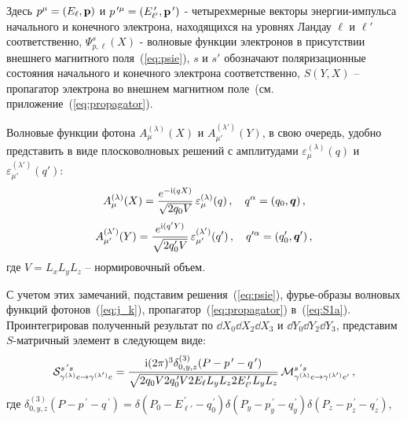 \noindent Здесь $p^{\mu} = (E_{\ell}, {\bf p})$ и $p^{\, \prime \mu} =
(E^{\, \prime}_{\ell'}, {\bf p}^{\, \prime})$ - четырехмерные векторы 
энергии-импульса начального и конечного электрона, находящихся на уровнях Ландау 
$\ell$ и $\ell'$  соответственно,
$\Psi^s_{p,\ell}(X)$ - волновые функции электронов в присутствии внешнего 
магнитного поля~(\ref{eq:psie}), $s$ и $s'$ обозначают 
поляризационные состояния начального и конечного электрона 
соответственно, $S(Y,X)$ -- пропагатор электрона во внешнем магнитном поле~(см. приложение~(\ref{eq:propagator}). 

Волновые функции фотона $A^{(\lambda)}_\mu(X)$ и $A^{(\lambda')}_{\mu'}(Y)$, в свою очередь,  удобно представить в виде плосковолновых решений с амплитудами $\varepsilon^{(\lambda)}_\mu(q)$ и $\varepsilon^{(\lambda')}_{\mu'}(q')$:
%
\begin{eqnarray}
	\label{eq:j_k}
	A^{(\lambda)}_\mu (X) = \frac{e^{-\mathrm{i}(qX)}}{\sqrt{2q_0 V}} \, \varepsilon^{(\lambda)}_\mu(q) \, , \quad  q^{\alpha} = (q_0, {\boldsymbol q})\, ,
\end{eqnarray}
%
\begin{eqnarray}
	\label{eq:j_k'}
	A^{(\lambda')}_{\mu'} (Y) = \frac{e^{\mathrm{i}(q'Y)}}{\sqrt{2q'_0 V}} \, \varepsilon^{(\lambda')}_{\mu'}(q') \, , \quad  q'^{\alpha} = (q'_0, {\boldsymbol q'})\, , 
\end{eqnarray}
\noindent где  $V = L_x L_y L_z$ -- нормировочный объем.

С учетом этих замечаний, подставим решения~(\ref{eq:psie}),  фурье-образы волновых функций фотонов~(\ref{eq:j_k}),
пропагатор~(\ref{eq:propagator})  в~(\ref{eq:S1a}).  Проинтегрировав полученный результат по $\dd X_0 \dd X_2 \dd X_3$ и  $\dd Y_0 \dd Y_2 \dd Y_3$,  представим  $S$-матричный элемент  в следующем виде:
%
\begin{eqnarray}
	\label{eq:S2}                                  
	{\cal S}^{s^{\,\prime} s}_{\gamma^{(\lambda)} e\to \gamma^{(\lambda')} e} = \frac{\mathrm{i} (2\pi)^3 
		\delta^{(3)}_{0,y,z} (P - p^{\, \prime} - q^{\, \prime})}
	{\sqrt{2q_0 V 2q^{\, \prime}_0 V 2 E_{\ell} L_y L_z 2 E^{\, \prime}_{\ell'}L_y L_z}}\, 
	{\cal M}^{s^{\, \prime} s}_{\gamma^{(\lambda)} e\to \gamma^{(\lambda')} e'} \, , 
\end{eqnarray}
\noindent где $\delta^{(3)}_{0,y,z} (P - p^{\, \prime} - q^{\, \prime}) 
= \delta (P_0 - E^{\, \prime}_{\ell'}-q^{\, \prime}_0) 
\delta (P_y - p^{\, \prime}_y - q^{\, \prime}_y) 
\delta (P_z - p^{\, \prime}_z - q^{\, \prime}_z)$, 

